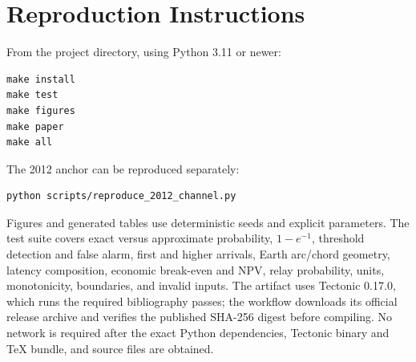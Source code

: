 \documentclass[11pt]{article}
\begin{document}
\section{Reproduction Instructions}

From the project directory, using Python 3.11 or newer:

\begin{verbatim}
make install
make test
make figures
make paper
make all
\end{verbatim}

The 2012 anchor can be reproduced separately:

\begin{verbatim}
python scripts/reproduce_2012_channel.py
\end{verbatim}

Figures and generated tables use deterministic seeds and explicit parameters. The test suite covers exact versus approximate probability, $1-e^{-1}$, threshold detection and false alarm, first and higher arrivals, Earth arc/chord geometry, latency composition, economic break-even and NPV, relay probability, units, monotonicity, boundaries, and invalid inputs. The artifact uses Tectonic 0.17.0, which runs the required bibliography passes; the workflow downloads its official release archive and verifies the published SHA-256 digest before compiling. No network is required after the exact Python dependencies, Tectonic binary and TeX bundle, and source files are obtained.



\end{document}
